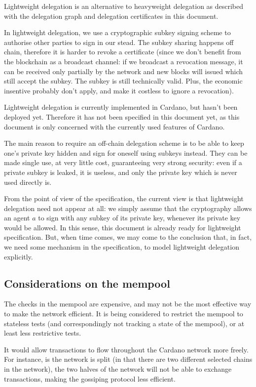 \documentclass{article}
\begin{document}
Lightweight delegation is an alternative to heavyweight delegation as
described with the delegation graph and delegation certificates in
this document.

In lightweight delegation, we use a cryptographic subkey signing
scheme to authorise other parties to sign in our stead. The subkey
sharing happens off chain, therefore it is harder to revoke a
certificate (since we don't benefit from the blockchain as a broadcast
channel: if we broadcast a revocation message, it can be received only
partially by the network and new blocks will issued which still accept
the subkey. The subkey is still technically valid. Plus, the economic
insentive probably don't apply, and make it costless to ignore a
revocation).

Lightweight delegation is currently implemented in Cardano, but hasn't
been deployed yet. Therefore it has not been specified in this
document yet, as this document is only concerned with the currently
used features of Cardano.

The main reason to require an off-chain delegation scheme is to be
able to keep one's private key hidden and sign for oneself using
subkeys instead. They can be made single use, at very little cost,
guaranteeing very strong security: even if a private subkey is leaked,
it is useless, and only the private key which is never used directly
is.

From the point of view of the specification, the current view is that
lightweight delegation need not appear at all: we simply assume that
the cryptography allows an agent $a$ to sign with any subkey of its
private key, whenever its private key would be allowed. In this sense,
this document is already ready for lightweight specification. But,
when time comes, we may come to the conclusion that, in fact, we need
some mechanism in the specification, to model lightweight delegation
explicitly.

\subsection{Considerations on the mempool}
\label{sec:appendix-mempool}

The checks in the mempool are expensive, and may not be the most
effective way to make the network efficient. It is being considered to
restrict the mempool to stateless tests (and correspondingly not
tracking a state of the mempool), or at least less restrictive tests.

It would allow transactions to flow throughout the Cardano network
more freely. For instance, is the network is split (in that there are
two different selected chains in the network), the two halves of the
network will not be able to exchange transactions, making the
gossiping protocol less efficient.
\end{document}
